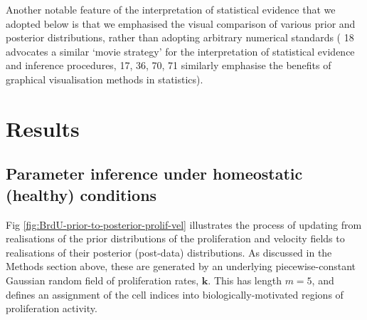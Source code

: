 \documentclass[10pt,letterpaper]{article}
\providecommand{\DIFaddtex}[1]{{\protect\color{blue} \sf #1}} %
\providecommand{\DIFdeltex}[1]{{\protect\color{red} \scriptsize #1}} %
\providecommand{\DIFaddbegin}{} %
\providecommand{\DIFdelend}{} %
\providecommand{\DIFadd}[1]{\texorpdfstring{\DIFaddtex{#1}}{#1}} %
\providecommand{\DIFdel}[1]{\texorpdfstring{\DIFdeltex{#1}}{}} %
\begin{document}
\DIFdel{Another notable feature of the interpretation of statistical evidence
that we adopted below is that we emphasised the visual comparison of
various prior and posterior distributions, rather than adopting
arbitrary numerical standards (}%
\DIFdel{18}%
\DIFdel{advocates a similar `movie
strategy' for the interpretation of statistical evidence and inference
procedures, }%
\DIFdel{17, 36, 70, 71}%
\DIFdel{similarly emphasise the benefits of
graphical visualisation methods in statistics).
}%

\DIFdelend \section{Results}\label{results}

\subsection{Parameter inference under homeostatic (healthy)
conditions}\label{parameter-inference-under-homeostatic-healthy-conditions}

Fig \ref{fig:BrdU-prior-to-posterior-prolif-vel} illustrates the process
of updating from realisations of the prior distributions of the
proliferation and velocity fields to realisations of their posterior
(post-data) distributions. \DIFaddbegin \DIFadd{As discussed in the Methods section above,
these are generated by an underlying piecewise-constant Gaussian random
field of proliferation rates, \(\mathbf{k}\). This has length \(m=5\),
and defines an assignment of the cell indices into
biologically-motivated regions of proliferation activity.
}
\end{document}
